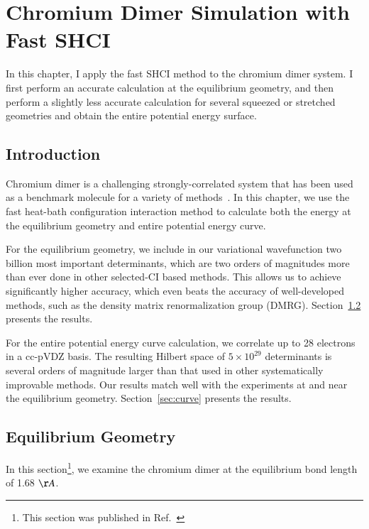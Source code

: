 \chapter{Chromium Dimer Simulation with Fast SHCI}
In this chapter, I apply the fast SHCI method to the chromium dimer system.
I first perform an accurate calculation at the equilibrium geometry, and then perform a slightly less accurate calculation for several squeezed or stretched geometries and obtain the entire potential energy surface.

\section{Introduction}

Chromium dimer is a challenging strongly-correlated system
that has been used as a benchmark molecule for a variety of methods~\cite{Scu-JCP-91,KurYan-JCP-11,PurZhaKra-JCP-15,MaManOlsGag-JCTC-16,VanMalVer-JCTC-16,GuoWatHuSunCha-JCTC-16}.
In this chapter, we use the fast heat-bath configuration interaction method to calculate both the energy at the equilibrium geometry and entire potential energy curve.

For the equilibrium geometry, we include in our variational wavefunction two billion most important determinants, which are two orders of magnitudes more than ever done in other selected-CI based methods.
This allows us to achieve significantly higher accuracy, which even beats the accuracy of well-developed methods, such as the density matrix renormalization group (DMRG).
Section~\ref{sec:eq} presents the results.

For the entire potential energy curve calculation, we correlate up to 28 electrons in a cc-pVDZ basis.
The resulting Hilbert space of $5 \times 10^{29}$ determinants is several orders of magnitude larger than that used in other
systematically improvable methods.
Our results match well with the experiments at and near the equilibrium geometry.
Section~\ref{sec:curve} presents the results.

\section{Equilibrium Geometry}
\label{sec:eq}
In this section\footnote{This section was published in Ref.~\cite{li2018fast}}, we examine the chromium dimer at the equilibrium bond length of 1.68 $\AA$. %

